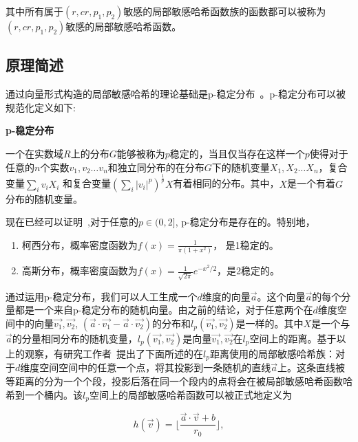 其中所有属于$ (r,cr,p_1,p_2) $敏感的局部敏感哈希函数族的函数都可以被称为$ (r,cr,p_1,p_2) $敏感的局部敏感哈希函数。

\subsection{原理简述}

通过向量形式构造的局部敏感哈希的理论基础是p-稳定分布~\cite{PS31}。p-稳定分布可以被规范化定义如下:

\begin{definition}
	{\bf p-稳定分布}
	
	一个在实数域$ R $上的分布$ G $能够被称为$ p $稳定的，当且仅当存在这样一个$ p $使得对于任意的$ n $个实数$ v_1,v_2\dots v_n $和独立同分布的在分布$ G $下的随机变量$ X_1,X_2\dots X_n $，复合变量$ \sum_{i} v_iX_i $ 和复合变量$ (\sum_{i} |v_i|^p)^{\frac{1}{p}}X $有着相同的分布。其中，$ X $是一个有着$ G $分布的随机变量。
\end{definition}

现在已经可以证明~\cite{PS31},对于任意的$ p \in (0,2] $, p-稳定分布是存在的。特别地，

\begin{enumerate}[$ \bullet $]
	
	\item 柯西分布，概率密度函数为$ f(x) = \frac{1}{\pi (1+x^{2})} $， 是1稳定的。
	
	\item 高斯分布，概率密度函数为$ f(x) = \frac{1}{\sqrt{2\pi}}e^{-x^2/2} $，是2稳定的。
	
\end{enumerate}

通过运用p-稳定分布，我们可以人工生成一个$ d $维度的向量$ \vec{a} $。这个向量$ \vec{a} $的每个分量都是一个来自p-稳定分布的随机向量。由之前的结论，对于任意两个在$ d $维度空间中的向量$ \vec{v_1},\vec{v_2} $, $ (\vec{a}\cdot\vec{v_1} - \vec{a}\cdot\vec{v_2}) $的分布和$ l_p(\vec{v_1},\vec{v_2}) $是一样的。其中$ X $是一个与$ \vec{a} $的分量相同分布的随机变量，$ l_p(\vec{v_1},\vec{v_2})$是向量$\vec{v_1},\vec{v_2}$在$ l_p $空间上的距离。基于以上的观察，有研究工作者~\cite{lazy18}提出了下面所述的在$ l_p $距离使用的局部敏感哈希族：对于$ d $维度空间空间中的任意一个点，将其投影到一条随机的直线$ \vec{a} $上。这条直线被等距离的分为一个个段，投影后落在同一个段内的点将会在被局部敏感哈希函数哈希到一个桶内。该$ l_p $空间上的局部敏感哈希函数可以被正式地定义为

\begin{equation}
h(\vec{v}) = \lfloor \frac{\vec{a} \cdot \vec{v}+b}{r_0}\rfloor, 
\end{equation}

